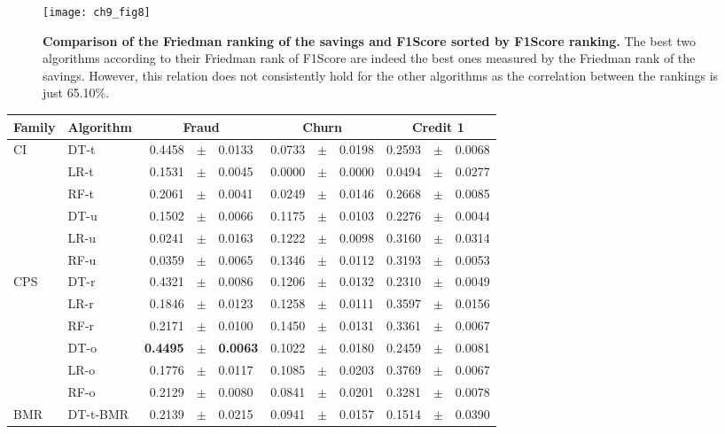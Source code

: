 {  \begin{figure}[b!]
  \centering
  \texttt{[image: ch9\_fig8]}
  \caption{\textbf{Comparison of the Friedman ranking of the savings and F1Score sorted by F1Score 
  ranking.} The best two algorithms according to their Friedman rank of F1Score are indeed the 
  best ones measured by the Friedman rank of the savings. However, this relation does not 
  consistently hold for the other algorithms as the correlation between the rankings is just 
  65.10\%.}
  \label{fig:9:friedman_vs_fscore}
  \end{figure}

\begin{table}[!t]
     \centering
    \footnotesize
    \begin{tabular}{l l r@{\hskip 0in}c@{\hskip 0in}l r@{\hskip 0in}c@{\hskip 0in}l r@{\hskip 
0in}c@{\hskip 0in}l} %
      \hline
    \bf{Family} & \bf{Algorithm} & \multicolumn{3}{c}{\bf{Fraud}} & 
\multicolumn{3}{c}{\bf{Churn}} & \multicolumn{3}{c}{\bf{Credit 1}} \\
      \hline
CI&DT-t & 0.4458 &$\pm$& 0.0133 & 0.0733 &$\pm$& 0.0198 & 0.2593 &$\pm$& 0.0068 \\
&LR-t & 0.1531 &$\pm$& 0.0045 & 0.0000 &$\pm$& 0.0000 & 0.0494 &$\pm$& 0.0277 \\
&RF-t & 0.2061 &$\pm$& 0.0041 & 0.0249 &$\pm$& 0.0146 & 0.2668 &$\pm$& 0.0085 \\
&DT-u & 0.1502 &$\pm$& 0.0066 & 0.1175 &$\pm$& 0.0103 & 0.2276 &$\pm$& 0.0044 \\
&LR-u & 0.0241 &$\pm$& 0.0163 & 0.1222 &$\pm$& 0.0098 & 0.3160 &$\pm$& 0.0314 \\
&RF-u & 0.0359 &$\pm$& 0.0065 & 0.1346 &$\pm$& 0.0112 & 0.3193 &$\pm$& 0.0053 \\
\hline 
CPS&DT-r & 0.4321 &$\pm$& 0.0086 & 0.1206 &$\pm$& 0.0132 & 0.2310 &$\pm$& 0.0049 \\
&LR-r & 0.1846 &$\pm$& 0.0123 & 0.1258 &$\pm$& 0.0111 & 0.3597 &$\pm$& 0.0156 \\
&RF-r & 0.2171 &$\pm$& 0.0100 & 0.1450 &$\pm$& 0.0131 & 0.3361 &$\pm$& 0.0067 \\
&DT-o & \bf{0.4495} &\bf{$\pm$}& \bf{0.0063} & 0.1022 &$\pm$& 0.0180 & 0.2459 &$\pm$& 0.0081 \\
&LR-o & 0.1776 &$\pm$& 0.0117 & 0.1085 &$\pm$& 0.0203 & 0.3769 &$\pm$& 0.0067 \\
&RF-o & 0.2129 &$\pm$& 0.0080 & 0.0841 &$\pm$& 0.0201 & 0.3281 &$\pm$& 0.0078 \\
\hline 
BMR&DT-t-BMR & 0.2139 &$\pm$& 0.0215 & 0.0941 &$\pm$& 0.0157 & 0.1514 &$\pm$& 0.0390 \\

\end{tabular}
\end{table}}
